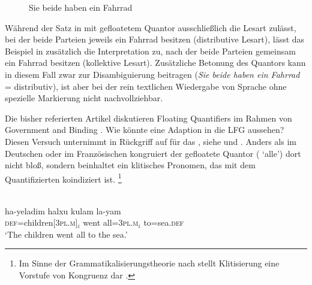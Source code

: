 \begin{figure}
\caption{Sie beide haben ein Fahrrad}
\label{fig:siebeidefhrd_2}
\end{figure}

Während der Satz in  mit gefloatetem Quantor
ausschließlich die Lesart zulässt, bei der beide Parteien jeweils ein Fahrrad
besitzen (distributive Lesart), lässt das Beispiel in 
zusätzlich die Interpretation zu, nach der beide Parteien gemeinsam ein Fahrrad
besitzen (kollektive Lesart). Zusätzliche Betonung des Quantors kann in diesem
Fall zwar zur Disambiguierung beitragen (\emph{Sie \emph{beide} haben ein
Fahrrad} = distributiv), ist aber bei der rein textlichen Wiedergabe von Sprache
ohne spezielle Markierung nicht nachvollziehbar.

\label{phsec:hebrqf}
Die bisher referierten Artikel diskutieren Floating Quantifiers im Rahmen von
Government and Binding \autocite{chomsky1981}. Wie könnte eine Adaption in die
LFG aussehen? Diesen Versuch unternimmt \citet{spector2009} in Rückgriff auf
\citet{shlonsky1991} für das , siehe  und
. Anders als im Deutschen oder im Französischen
kongruiert der gefloatete Quantor ( `alle') dort nicht bloß, sondern
beinhaltet ein klitisches Pronomen, das mit dem Quantifizierten koindiziert
ist.%
%
	\footnote{Im Sinne der Grammatikalisierungs\-theorie nach
		\citet{lehmann2015} stellt Klitisierung eine Vorstufe von Kongruenz dar
		\autocite[vgl.][44]{lehmann2015}.%
	}

\begin{exe}
\ex \label{ex:hebrqf}
	\langinfo%
		{}
		{}
		{\cite[nach][522, 537]{spector2009}}\\
	\gll ha-yeladim halxu kulam la-yam \\
		\textsc{def}=children[\textsc{3pl.m}]$_i$ went all=\textsc{3pl.m}$_i$
			to=sea.\textsc{def} \\
	\trans `The children went all to the sea.'
\end{exe}

